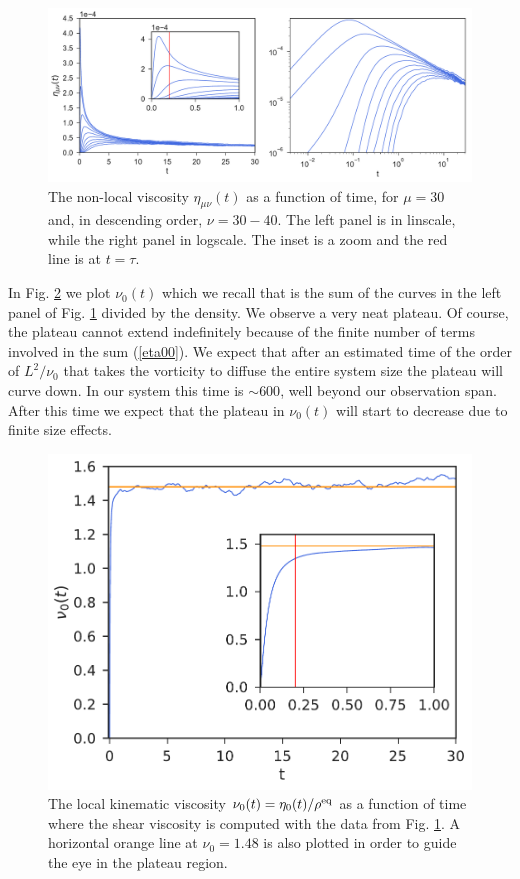 \documentclass[a4paper,openright,12pt]{book}
\newcommand{\Pendiente}[1]{{\color{green}#1}} %
\begin{document}
\begin{figure}[h!]
  \centering
\includegraphics[scale=0.45]{Etat-PBC}
\caption[The non-local viscosity as a function of time for PBC system]{The non-local viscosity $\eta_{\mu\nu}(t)$ as a function of time, for $\mu=30$ and, in descending order, $\nu=30-40$. The left panel is in linscale, while the right panel in logscale. The inset is a zoom and the red line is at $t=\tau$.}
\label{fig:Etat-PBC}
\end{figure}


In Fig.
\ref{fig:KinVisc0t-PBC} we plot $\nu_0(t)$  which we recall that
is the sum  of the curves in  the left panel of Fig. \ref{fig:Etat-PBC} divided by the density. We observe  a very neat
plateau.  Of course, the plateau cannot extend indefinitely because of
the  finite number  of terms  involved  in the  sum (\ref{eta00}).  \Pendiente{We
expect that after  an estimated time of the order  of $L^2/\nu_0$ that
takes the vorticity to diffuse the entire system size the plateau will
curve down.  In our system  this time is  $\sim 600$, well  beyond our
observation  span. After  this  time  we expect  that  the plateau  in
$\nu_0(t)$ will start to decrease due to finite size effects.}
\begin{figure}[h!]
  \centering
\includegraphics[scale=0.45]{KinVisc0t-PBC}
\caption[The local kinematic viscosity for PBC system]{The local kinematic viscosity $\nu_0(t)=\eta_0(t)/\rho^{\rm eq}$ as a function of time where the shear viscosity is computed with the data from Fig. \ref{fig:Etat-PBC}. A horizontal orange line at $\nu_0=1.48$ is also plotted in order to guide the eye in the plateau region.}
\label{fig:KinVisc0t-PBC}
\end{figure}
\end{document}
